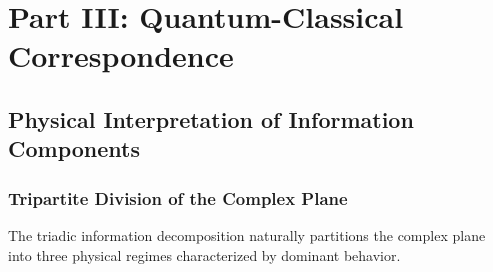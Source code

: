 \documentclass[12pt]{article}
\theoremstyle{plain}
\theoremstyle{definition}
\begin{document}
\section{Part III: Quantum-Classical Correspondence}

\subsection{Physical Interpretation of Information Components}

\subsubsection{Tripartite Division of the Complex Plane}

The triadic information decomposition naturally partitions the complex plane into three physical regimes characterized by dominant behavior.
\end{document}
